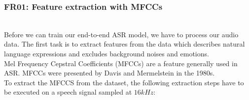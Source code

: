 
\subsubsection{FR01: Feature extraction with MFCCs}\label{mfccs}~\\


Before we can train our end-to-end ASR model, we have to process our audio data.
The first task is to extract features from the data which describes natural
language expressions and excludes background noises and emotions.\\


Mel Frequency Cepstral Coefficients (MFCCs) are a feature generally used in ASR.
MFCCs were presented by Davis and Mermelstein in the 1980s.~\cite{mfcc}\\

To extract the MFCCS from the dataset, the following extraction steps have to be
executed on a speech signal sampled at $16kHz$:\\

